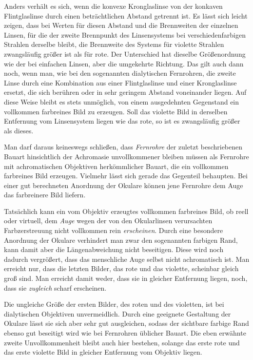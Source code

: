 Anders verhält es sich, wenn die konvexe Kronglaslinse von der konkaven Flintglaslinse durch einen beträchtlichen Abstand getrennt ist. Es lässt sich leicht zeigen, dass bei Werten für diesen Abstand und die Brennweiten der einzelnen Linsen, für die der zweite Brennpunkt des Linsensystems bei verschiedenfarbigen Strahlen derselbe bleibt, die Brennweite des Systems für violette Strahlen zwangsläufig größer ist als für rote. Der Unterschied hat dieselbe Größenordnung wie der bei einfachen Linsen, aber die umgekehrte Richtung. Das gilt auch dann noch, wenn man, wie bei den sogenannten dialytischen Fernrohren, die zweite Linse durch
eine Kombination aus einer Flintglaslinse und einer Kronglaslinse ersetzt, die sich berühren oder in sehr geringem Abstand voneinander liegen. Auf diese Weise bleibt es stets unmöglich, von einem ausgedehnten Gegenstand ein vollkommen farbreines Bild zu erzeugen. Soll das violette Bild in derselben Entfernung vom Linsensystem liegen wie das rote, so ist es zwangsläufig größer als dieses.

Man darf daraus keineswegs schließen, dass \textit{Fernrohre} der zuletzt beschriebenen Bauart hinsichtlich der Achromasie unvollkommener bleiben müssen als Fernrohre mit achromatischen Objektiven herkömmlicher Bauart, die ein vollkommen farbreines Bild erzeugen. Vielmehr lässt sich gerade das Gegenteil behaupten. Bei einer gut berechneten Anordnung der Okulare können jene Fernrohre dem Auge das farbreinere Bild liefern.

Tatsächlich kann ein vom Objektiv erzeugtes vollkommen farbreines Bild, ob reell oder virtuell, dem \textit{Auge} wegen der von den Okularlinsen verursachten Farbzerstreuung nicht vollkommen rein \textit{erscheinen}. Durch eine besondere Anordnung der Okulare verhindert man zwar den sogenannten farbigen Rand, kann damit aber die Längenabweichung nicht beseitigen. Diese wird noch dadurch vergrößert, dass das menschliche Auge selbst nicht achromatisch ist. Man erreicht nur, dass die letzten Bilder, das rote und das violette, scheinbar gleich groß sind. Man erreicht damit weder, dass sie in gleicher Entfernung liegen, noch, dass sie \textit{zugleich} scharf erscheinen.

Die ungleiche Größe der ersten Bilder, des roten und des violetten, ist bei dialytischen Objektiven unvermeidlich. Durch eine geeignete Gestaltung der Okulare lässt sie sich aber sehr gut ausgleichen, sodass der sichtbare farbige Rand ebenso gut beseitigt wird wie bei Fernrohren üblicher Bauart. Die eben erwähnte zweite Unvollkommenheit bleibt auch hier bestehen, solange das erste rote und das erste violette Bild in gleicher Entfernung vom Objektiv liegen.

